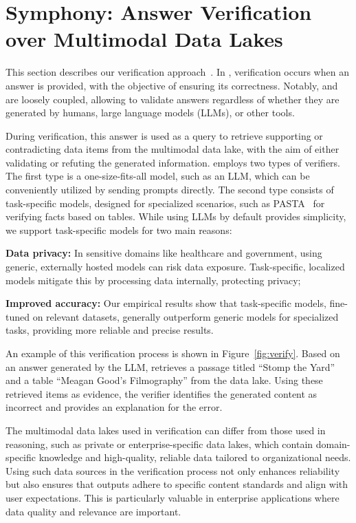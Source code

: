 \section{Symphony: Answer Verification over Multimodal Data Lakes}
\label{sec:verifai}

This section describes our verification approach~\cite{verifai}. In \sys, verification occurs when an answer is provided, with the objective of ensuring its correctness. Notably, \reason and \verify are loosely coupled, allowing \verify to validate answers regardless of whether they are generated by humans, large language models (LLMs), or other tools.

During verification, this answer is used as a query to retrieve supporting or contradicting data items from the multimodal data lake, with the aim of either validating or refuting the generated information.
\sys employs two types of verifiers. The first type is a one-size-fits-all model, such as an LLM, which can be conveniently utilized by sending prompts directly. The second type consists of task-specific models, designed for specialized scenarios, such as PASTA~\cite{pasta} for verifying facts based on tables. While using LLMs by default provides simplicity, we support task-specific models for two main reasons:

\be  
	\item {\bf Data privacy:} 
	In sensitive domains like healthcare and government, using generic, externally hosted models can risk data exposure. Task-specific, localized models mitigate this by processing data internally, protecting privacy; 
	
	\item {\bf Improved accuracy:} 
	Our empirical results show that task-specific models, fine-tuned on relevant datasets, generally outperform generic models for specialized tasks, providing more reliable and precise results.
\ee


An example of this verification process is shown in Figure~\ref{fig:verify}. Based on an answer generated by the LLM, \sys retrieves a passage titled ``Stomp the Yard'' and a table ``Meagan Good’s Filmography'' from the data lake. Using these retrieved items as evidence, the verifier identifies the generated content as incorrect and provides an explanation for the error.


The multimodal data lakes used in verification can differ from those used in reasoning, such as private or enterprise-specific data lakes, which contain domain-specific knowledge and high-quality, reliable data tailored to organizational needs. Using such data sources in the verification process not only enhances reliability but also ensures that outputs adhere to specific content standards and align with user expectations. This is particularly valuable in enterprise applications where data quality and relevance are important.

